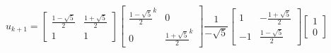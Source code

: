 \documentclass[preview]{standalone}
\begin{document}
\begin{center}
$$u_{k + 1} = \begin{bmatrix} \frac{1 - \sqrt{5}}{2} & \frac{1 + \sqrt{5}}{2} \\ 1 & 1 \end{bmatrix} \begin{bmatrix} \frac{1 - \sqrt{5}}{2}^k &  0 \\ 0 & \frac{1 + \sqrt{5}}{2}^k \end{bmatrix} \frac{1}{-\sqrt{5}}\begin{bmatrix} 1 & - \frac{1 + \sqrt{5}}{2} \\ -1 & \frac{1 - \sqrt{5}}{2} \end{bmatrix} \begin{bmatrix} 1 \\ 0 \end{bmatrix}$$
\end{center}
\end{document}
